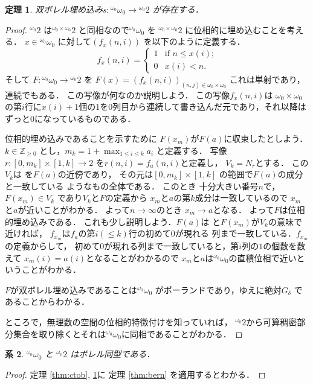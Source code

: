 \documentclass[leqno, 12pt]{jsarticle}
\newtheorem{thm}{定理}
\newtheorem{cor}[thm]{系}
\newcommand{\zz}{\mathbb{Z}}
\newcommand{\myomega}{\omega_{0}}
\newcommand{\mycantor}{{}^{\myomega}2}
\newcommand{\mycantorb}{{}^{\myomega\times \myomega}2}
\newcommand{\mybaire}{{}^{\myomega}\myomega}
\newcommand{\mynbd}[1]{N_{#1}}
\begin{document}
\begin{thm}\label{thm:btoc}
双ボレル埋め込み$s\colon \mybaire \to \mycantor$
が存在する．
\end{thm}
\begin{proof}
$\mycantor$
は$\mycantorb$
と同相なので$\mybaire$
を
$\mycantorb$
に位相的に埋め込むことを考える．
$x\in \mybaire$
に対して$(f_{x}(n, i))$
を以下のように定義する．
\[
f_{x}(n, i)=
\begin{cases}
1 & \text{if $n\le x(i)$;}\\
0 & \text{$x(i)<n$.}
\end{cases}
\]
そして
$F\colon \mybaire\to \mycantor$
を
$F(x)=(f_{x}(n, i))_{(n, j)\in \myomega\times \myomega}$
これは単射であり，
連続でもある．
この写像が何なのか説明しよう．
この写像$f_{x}(n, i)$は
$\myomega\times \myomega$
の第$i$行に$x(i)+1$個の$1$を$0$列目から連続して書き込んだ元であり，それ以降はずっと$0$になっているものである．

位相的埋め込みであることを示すために
$F(x_{m})$が$F(a)$に収束したとしよう．
$k\in \zz_{\ge 0}$
とし，$m_{k}=1+\max_{1\le i\le k}a_{i}$
と定義する．
写像$r\colon [0, m_{k}]\times [1, k]\to 2$
を$r(n, i)=f_{a}(n, i)$と定義し，
$V_{k}=\mynbd{r}$とする．
この$V_{k}$は
を$F(a)$の近傍であり，
その元は$[0, m_{k}]\times [1, k]$
の範囲で$F(a)$の成分と一致している
ようなもの全体である．
このとき
十分大きい番号$n$で，
$F(x_{m})\in V_{k}$
であり$V_{k}$と$F$の定義から
$x_{m}$と$a$の第$k$成分は一致しているので
$x_{m}$と$a$が近いことがわかる．
よって$n\to \infty$のとき
$x_{m}\to a$となる．
よって$F$は位相的埋め込みである．
これも少し説明しよう．$F(a)$は
と$F(x_{m})$が$V_{k}$の意味で近ければ，
$f_{x_{m}}$は$f_{a}$の第$i(\le k)$行の初めて$0$が現れる
列まで一致している．$f_{x_{m}}$の定義からして，
初めて$0$が現れる列まで一致していると，第$i$列の$1$の個数を数えて
$x_{m}(i)=a(i)$となることがわかるので
$x_{m}$と$a$は$\mybaire$の直積位相で近いということがわかる．

$F$が双ボレル埋め込みであることは$\mybaire$
がポーランドであり，ゆえに絶対$G_{\delta}$
であることからわかる．

ところで，無理数の空間の位相的特徴付けを知っていれば，
$\mycantor$から可算稠密部分集合を取り除くとそれは$\mybaire$に同相であることがわかる．
\end{proof}


\begin{cor}\label{cor:btoc}
$\mybaire$
と
$\mycantor$
はボレル同型である．
\end{cor}
\begin{proof}
定理 \ref{thm:ctob}, 
\ref{thm:btoc}に
定理 \ref{thm:bern}
を適用するとわかる．
\end{proof}
\end{document}
